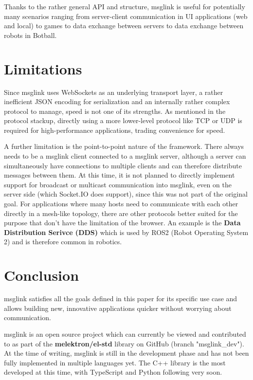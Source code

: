 \documentclass[conference]{IEEEtran}
\begin{document}
Thanks to the rather general API and structure, msglink is useful for potentially many scenarios ranging from server-client communication in UI applications (web and local) to games to data exchange between servers to data exchange between robots in Botball.


\section{Limitations}

Since msglink uses WebSockets as an underlying transport layer, a rather inefficient JSON encoding for serialization and an internally rather complex protocol to manage, speed is not one of its strengths. As mentioned in the protocol stackup, directly using a more lower-level protocol like TCP or UDP is required for high-performance applications, trading convenience for speed.

A further limitation is the point-to-point nature of the framework. There always needs to be a msglink client connected to a msglink server, although a server can simultaneously have connections to multiple clients and can therefore distribute messages between them. At this time, it is not planned to directly implement support for broadcast or multicast communication into msglink, even on the server side (which Socket.IO does support), since this was not part of the original goal. For applications where many hosts need to communicate with each other directly in a mesh-like topology, there are other protocols better suited for the purpose that don't have the limitation of the browser. An example is the \textbf{Data Distribution Serivce (DDS)} which is used by ROS2 (Robot Operating System 2) and is therefore common in robotics.


\section{Conclusion}

msglink satisfies all the goals defined in this paper for its specific use case and allows building new, innovative applications quicker without worrying about communication.

msglink is an open source project which can currently be viewed and contributed to as part of the \textbf{melektron/el-std} library on GitHub (branch "msglink\_dev"). At the time of writing, msglink is still in the development phase and has not been fully implemented in multiple languages yet. The C++ library is the most developed at this time, with TypeScript and Python following very soon. \cite{el-std-gh}
\end{document}
